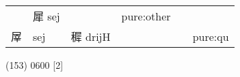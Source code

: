 \documentclass[14pt,a4paper]{scrartcl}
\begin{document}
\begin{longtable}[c]{@{}llllll@{}}
\begin{minipage}[t]{0.14\columnwidth}
\strut\end{minipage} &
\begin{minipage}[t]{0.14\columnwidth}\raggedright\strut
犀 sej
\strut\end{minipage} &
\begin{minipage}[t]{0.14\columnwidth}\raggedright\strut
\strut\end{minipage} &
\begin{minipage}[t]{0.14\columnwidth}\raggedright\strut
pure:other
\strut\end{minipage}\tabularnewline
\begin{minipage}[t]{0.14\columnwidth}\raggedright\strut
屖
\strut\end{minipage} &
\begin{minipage}[t]{0.14\columnwidth}\raggedright\strut
sej
\strut\end{minipage} &
\begin{minipage}[t]{0.14\columnwidth}\raggedright\strut
穉 drijH
\strut\end{minipage} &
\begin{minipage}[t]{0.14\columnwidth}\raggedright\strut
\strut\end{minipage} &
\begin{minipage}[t]{0.14\columnwidth}\raggedright\strut
\strut\end{minipage} &
\begin{minipage}[t]{0.14\columnwidth}\raggedright\strut
pure:qu
\strut\end{minipage}\tabularnewline
\bottomrule
\end{longtable}

(153) 0600 {[}2{]}
\end{document}
